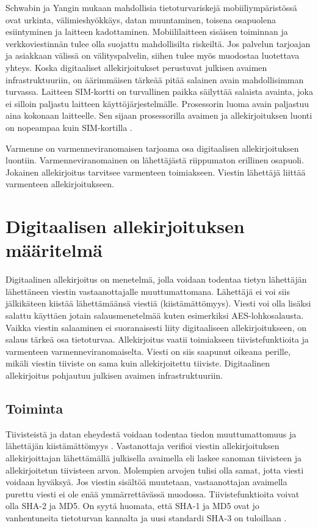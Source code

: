 \documentclass[finnish]{tktltiki2}
\theoremstyle{definition}
\theoremstyle{remark}
\begin{document}
Schwabin ja Yangin mukaan \cite{enti} mahdollisia tietoturvariskejä mobiiliympäristössä ovat urkinta, välimieshyökkäys, datan muuntaminen, toisena osapuolena esiintyminen ja laitteen kadottaminen. Mobiililaitteen sisäisen toiminnan ja verkkoviestinnän tulee olla suojattu mahdollisilta riskeiltä. Jos palvelun tarjoajan ja asiakkaan välissä on välityspalvelin, siihen tulee myös muodostaa luotettava yhteys. Koska digitaaliset allekirjoitukset perustuvat julkisen avaimen infrastruktuuriin, on äärimmäisen tärkeää pitää salainen avain mahdollisimman turvassa. Laitteen SIM-kortti on turvallinen paikka säilyttää salaista avainta, joka ei silloin paljastu laitteen käyttöjärjestelmälle. Prosessorin luoma avain paljastuu aina kokonaan laitteelle. Sen sijaan prosessorilla avaimen ja allekirjoituksen luonti on nopeampaa kuin SIM-kortilla \cite{proxy}. 

Varmenne on varmenneviranomaisen tarjoama osa digitaalisen allekirjoituksen luontiin. Varmenneviranomainen on lähettäjästä riippumaton erillinen osapuoli. Jokainen allekirjoitus tarvitsee varmenteen toimiakseen. Viestin lähettäjä liittää varmenteen allekirjoitukseen. \cite{ECC}       


\section{Digitaalisen allekirjoituksen määritelmä}

Digitaalinen allekirjoitus on menetelmä, jolla voidaan todentaa tietyn lähettäjän lähettäneen viestin vastaanottajalle muuttumattomana. Lähettäjä ei voi siis jälkikäteen kiistää lähettämäänsä viestiä (kiistämättömyys). Viesti voi olla lisäksi salattu käyttäen jotain salausmenetelmää kuten esimerkiksi AES-lohkosalausta. Vaikka viestin salaaminen ei suoranaisesti liity digitaaliseen allekirjoitukseen, on salaus tärkeä osa tietoturvaa. Allekirjoitus vaatii toimiakseen tiivistefunktioita ja varmenteen varmenneviranomaiselta. Viesti on siis saapunut oikeana perille, mikäli viestin tiiviste on sama kuin allekirjoitettu tiiviste. Digitaalinen allekirjoitus pohjautuu julkisen avaimen infrastruktuuriin.

\subsection{Toiminta} 

Tiivisteistä ja datan eheydestä voidaan todentaa tiedon muuttumattomuus ja lähettäjän kiistämättömyys \cite{moen}. Vastanottaja verifioi viestin allekirjoituksen allekirjoittajan lähettämällä julkisella avaimella eli laskee sanoman tiivisteen ja allekirjoitetun tiivisteen arvon. Molempien arvojen tulisi olla samat, jotta viesti voidaan hyväksyä. Jos viestin sisältöä muutetaan, vastaanottajan avaimella purettu viesti ei ole enää ymmärrettävässä muodossa. Tiivistefunktioita voivat olla SHA-2 ja MD5. On syytä huomata, että SHA-1 ja MD5 ovat jo vanhentuneita tietoturvan kannalta ja uusi standardi SHA-3 on tuloillaan \cite{nist}.   
\end{document}
